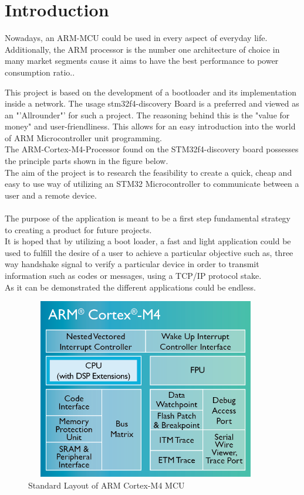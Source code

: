 \chapter{Introduction}

\glsaddall

Nowadays, an ARM-MCU could be used in every aspect of everyday life.
Additionally, the ARM processor is the number one architecture of choice in
many market segments cause it aims to have the best performance to power consumption ratio..

This project is based on the development of a bootloader and its implementation
inside a network. The usage stm32f4-discovery Board is a preferred and viewed as an
"'Allrounder"' for such a project. The reasoning behind this is the "value for money"
and user-friendliness. This allows for an easy introduction into the world of ARM
Microcontroller unit programming.\citep{ST-15}\\
The ARM-Cortex-M4-Processor found on the STM32f4-discovery board possesses
the principle parts shown in the figure below.\\
The aim of the project is to research the feasibility to create a quick, cheap
and easy to use way of utilizing an STM32 Microcontroller to communicate between
a user and a remote device.\citep{ARM-14}\\\\
The purpose of the application is meant to be a first step fundamental strategy to
creating a product for future projects.\\
It is hoped that by utilizing a boot loader, a fast and light application could
be used to fulfill the desire of a user to achieve a particular objective such
as, three way handshake signal to verify a particular device in order to transmit
information such as codes or messages, using a TCP/IP protocol stake.\\
As it can be demonstrated the different applications could be endless.\\

\begin{figure}[ht]
	\centering
	\includegraphics[width=400px, height=300px]{../img/Cortex-M4-chip-diagram-LG.png}
	\caption{Standard Layout of ARM Cortex-M4 MCU}
	\label{m4_prinzip}
\end{figure}

